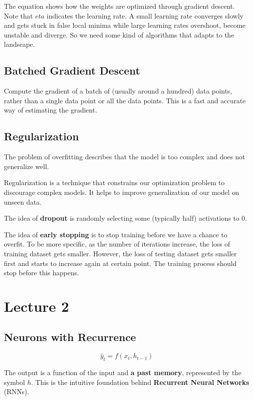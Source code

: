 \documentclass[12pt, a4paper, oneside]{article}
\begin{document}
The equation shows how the weights are optimized through gradient descent. Note that $eta$ indicates the learning rate. A small learning rate converges slowly and gets stuck in false local minima while large learning rates overshoot, become unstable and diverge. So we need some kind of algorithms that adapts to the landscape.

\subsection{Batched Gradient Descent}

Compute the gradient of a batch of (usually around a hundred) data points, rather than a single data point or all the data points. This is a fast and accurate way of estimating the gradient.

\subsection{Regularization}

The problem of overfitting describes that the model is too complex and does not generalize well.

Regularization is a technique that constrains our optimization problem to discourage complex models. It helps to improve generalization of our model on unseen data.

The idea of \textbf{dropout} is randomly selecting some (typically half) activations to $0$.

The idea of \textbf{early stopping} is to stop training before we have a chance to overfit. To be more specific, as the number of iterations increase, the loss of training dataset gets smaller. However, the loss of testing dataset gets smaller first and starts to increase again at certain point. The training process should stop before this happens.

\section{Lecture 2}

\subsection{Neurons with Recurrence}

\begin{equation*}
    \hat{y}_{t}=f(x_{t},h_{t-1})
\end{equation*}

The output is a function of the input and \textbf{a past memory}, represented by the symbol $h$. This is the intuitive foundation behind \textbf{Recurrent Neural Networks} (RNNs).
\end{document}
